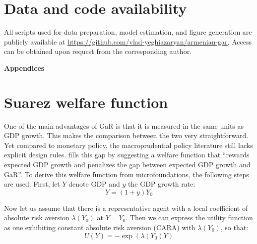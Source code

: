 \documentclass[12pt,a4paper]{article}
\begin{document}
\section*{Data and code availability}
All scripts used for data preparation, model estimation, and figure generation are publicly available at 
\url{https://github.com/vlad-yeghiazaryan/armenian-gar}. Access can be obtained upon request from the corresponding author.

\newpage





\newpage

\begin{flushleft}
    \LARGE\textbf{Appendices}\par
\end{flushleft}

\vspace{1cm}

\appendix

\section{Suarez welfare function}

\renewcommand{\thefigure}{\thesection.\arabic{figure}}
\setcounter{figure}{0}

\renewcommand{\thetable}{\thesection.\arabic{table}}
\setcounter{table}{0}


\label{appx:suarez}
One of the main advantages of GaR is that it is measured in the same units as GDP growth. This makes the comparison between the two very straightforward. Yet compared to monetary policy, the macroprudential policy literature still lacks explicit design rules. \citet{suarez2022} fills this gap by suggesting a welfare function that ``rewards expected GDP growth and penalizes the gap between expected GDP growth and GaR''. To derive this welfare function from microfoundations, the following steps are used.
First, let $Y$ denote GDP and $y$ the GDP growth rate:
\begin{equation}
    \label{eq:gdp_growth_theory}
    Y = (1+y)Y_0
\end{equation}

Now let us assume that there is a representative agent with a local coefficient of absolute risk aversion $\lambda(Y_0)$ at $Y=Y_0$. Then we can express the utility function as one exhibiting constant absolute risk aversion (CARA) with $\lambda(Y_0)$, so that:
\begin{equation}
    \label{eq:utility_theory}
    U(Y) = -\exp{\left(\lambda(Y_0)Y\right)}
\end{equation}
\end{document}
